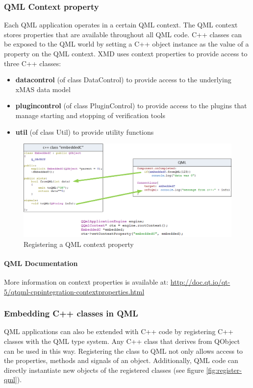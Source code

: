 \subsubsection{QML Context property}
Each QML application operates in a certain QML context. The QML context stores
properties that are available throughout all QML code. C++ classes can be exposed
to the QML world by setting a C++ object instance as the value of a property
on the QML context.
XMD uses context properties to provide access to three C++ classes:

\begin{itemize}
 \item \textbf{datacontrol} (of class DataControl) to provide access to the
 underlying xMAS data model
 \item \textbf{plugincontrol} (of class PluginControl) to provide access to
 the plugins that manage starting and stopping of verification tools
 \item \textbf{util} (of class Util) to provide utility functions
\end{itemize}

\begin{figure}
    \includegraphics[width=\textwidth]{qml3}
    \caption{Registering a QML context property}
\end{figure}

\paragraph{QML Documentation}
More information on context properties is available at:
\url{http://doc.qt.io/qt-5/qtqml-cppintegration-contextproperties.html}


\subsubsection{Embedding C++ classes in QML}

QML applications can also be extended with C++ code by registering C++ classes
with the QML type system. Any C++ class that derives from QObject can be used
in this way. Registering the class to QML not only allows access to the properties,
methods and signals of an object. Additionally, QML code can directly instantiate
new objects of the registered classes (see figure \ref{fig:register-qml}).

